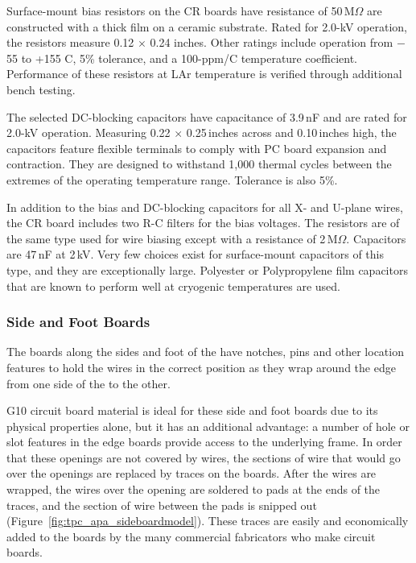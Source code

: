 Surface-mount bias resistors on the CR boards have resistance of 50\,M$\Omega$ are constructed with a thick film on a ceramic substrate. Rated for 2.0-kV operation, the resistors measure 0.12 $\times$ 0.24 inches. Other ratings include operation from $-$55 to +155 C, 5\% tolerance, and a 100-ppm/C temperature coefficient.
Performance of these resistors at LAr temperature is verified through additional bench testing.

The selected DC-blocking capacitors have capacitance of 3.9\,nF and are rated for 2.0-kV operation. Measuring 0.22 $\times$ 0.25\,inches across and 0.10\,inches high, the capacitors feature flexible terminals to comply with PC board expansion and contraction. They are designed to withstand 1,000 thermal cycles  
between the extremes of the operating temperature range. Tolerance is also 5\%.

In addition to the bias and DC-blocking capacitors for all X- and U-plane wires, the CR board includes two R-C filters for the bias voltages. The resistors are of the same type used for wire biasing except with a resistance of 2\,M$\Omega$. Capacitors are 47\,nF at 2\,kV. Very few choices exist for surface-mount capacitors of this type, and they are exceptionally large. 
Polyester or Polypropylene film capacitors that are known to perform well at cryogenic temperatures are used.


\subsubsection{Side and Foot Boards}

The boards along the sides and foot of the  have notches, pins and other location features to hold the wires in the correct position as they wrap around the edge from one side of the   to the other.


G10 circuit board material is ideal for these side and foot boards due to its physical properties alone, but it has an additional advantage: a number of hole or slot features in the edge boards provide access to the underlying frame.  In order that these openings are not covered by wires, the sections of wire that would go over the openings are replaced by traces on the boards.  After the wires are wrapped, the wires over the opening are soldered to pads at the ends of the traces, and the section of wire between the pads is snipped out (Figure~\ref{fig:tpc_apa_sideboardmodel}).  These traces are easily and economically added to the boards by the many commercial fabricators who make circuit boards. 

